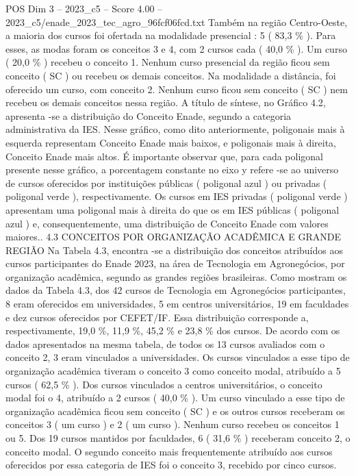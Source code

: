 \begin{textsample}{POS Dim 3 – 2023\_c5 – Score 4.00 – 2023\_c5/enade\_2023\_tec\_agro\_96fcf06fcd.txt}
Também na região Centro-Oeste, a maioria dos cursos foi ofertada na modalidade presencial : 5 ( 83,3 \% ).
Para esses, as modas foram os conceitos 3 e 4, com 2 cursos cada ( 40,0 \% ).
Um curso ( 20,0 \% ) recebeu o conceito 1.
Nenhum curso presencial da região ficou sem conceito ( SC ) ou recebeu os demais conceitos.
Na modalidade a distância, foi oferecido um curso, com conceito 2.
Nenhum curso ficou sem conceito ( SC ) nem recebeu os demais conceitos nessa região.
A título de síntese, no Gráfico 4.2, apresenta -se a distribuição do Conceito Enade, segundo a categoria administrativa da IES.
Nesse gráfico, como dito anteriormente, poligonais mais à esquerda representam Conceito Enade mais baixos, e poligonais mais à direita, Conceito Enade mais altos.
É importante observar que, para cada poligonal presente nesse gráfico, a porcentagem constante no eixo y refere -se ao universo de cursos oferecidos por instituições públicas ( poligonal azul ) ou privadas ( poligonal verde ), respectivamente.
Os cursos em IES privadas ( poligonal verde ) apresentam uma poligonal mais à direita do que os em IES públicas ( poligonal azul ) e, consequentemente, uma distribuição de Conceito Enade com valores maiores.. 4.3 CONCEITOS POR ORGANIZAÇÃO ACADÊMICA E GRANDE REGIÃO Na Tabela 4.3, encontra -se a distribuição dos conceitos atribuídos aos cursos participantes do Enade 2023, na área de Tecnologia em Agronegócios, por organização acadêmica, segundo as grandes regiões brasileiras.
Como mostram os dados da Tabela 4.3, dos 42 cursos de Tecnologia em Agronegócios participantes, 8 eram oferecidos em universidades, 5 em centros universitários, 19 em faculdades e dez cursos oferecidos por CEFET/IF.
Essa distribuição corresponde a, respectivamente, 19,0 \%, 11,9 \%, 45,2 \% e 23,8 \% dos cursos.
De acordo com os dados apresentados na mesma tabela, de todos os 13 cursos avaliados com o conceito 2, 3 eram vinculados a universidades.
Os cursos vinculados a esse tipo de organização acadêmica tiveram o conceito 3 como conceito modal, atribuído a 5 cursos ( 62,5 \% ).
Dos cursos vinculados a centros universitários, o conceito modal foi o 4, atribuído a 2 cursos ( 40,0 \% ).
Um curso vinculado a esse tipo de organização acadêmica ficou sem conceito ( SC ) e os outros cursos receberam os conceitos 3 ( um curso ) e 2 ( um curso ).
Nenhum curso recebeu os conceitos 1 ou 5.
Dos 19 cursos mantidos por faculdades, 6 ( 31,6 \% ) receberam conceito 2, o conceito modal.
O segundo conceito mais frequentemente atribuído aos cursos oferecidos por essa categoria de IES foi o conceito 3, recebido por cinco cursos.

\end{textsample}
